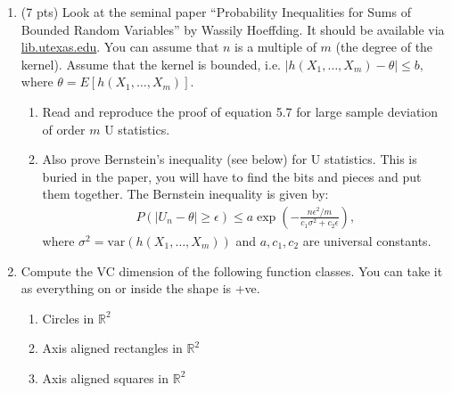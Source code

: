 \documentclass[11pt]{article}
\newcommand{\R}{\mathbb{R}}
\newcommand{\var}{\text{var}}
\begin{document}
\begin{enumerate}
\begin{enumerate}
\begin{enumerate}
	\end{enumerate}
\end{enumerate}
\item (7 pts) Look at the seminal paper ``Probability Inequalities for Sums of Bounded Random Variables'' by Wassily Hoeffding. It should be available via \url{lib.utexas.edu}. You can assume that $n$ is a multiple of $m$ (the degree of the kernel). Assume that the kernel is bounded, i.e. $|h(X_1,\dots,X_m)-\theta|\leq b$, where $\theta=E[h(X_1,\dots, X_m)]$.
\begin{enumerate}
	\item Read and reproduce the proof of equation 5.7 for large sample deviation of order $m$ U statistics. 
	\item Also prove Bernstein's inequality (see below) for U statistics. This is buried in the paper, you will have to find the bits and pieces and put them together. The Bernstein inequality is given by:
	\begin{align*}
	P(|U_n-\theta|\geq \epsilon)\leq a\exp\left(-\frac{ n \epsilon^2/m}{c_1\sigma^2+c_2 \epsilon}\right),
	\end{align*}
	where $\sigma^2=\var(h(X_1,\dots,X_m))$ and $a,c_1,c_2$ are universal constants.
\end{enumerate}

  \item Compute the VC dimension of the following function classes. You can take it as everything on or inside the shape is +ve.
\begin{enumerate}
	\item Circles in $\R^2$ 
	\item Axis aligned rectangles in $\R^2$
	\item Axis aligned squares in $\R^2$
\end{enumerate}
\end{enumerate}
\end{document}
